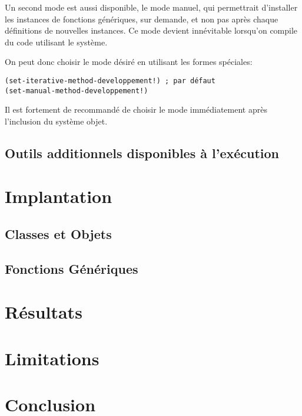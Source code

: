 \documentclass[letterpaper,12pt]{book}
\begin{document}
        Un second mode est aussi disponible, le mode manuel, qui
        permettrait d'installer les instances de fonctions génériques,
        sur demande, et non pas après chaque définitions de nouvelles
        instances. Ce mode devient innévitable lorsqu'on compile du
        code utilisant le système.

        On peut donc choisir le mode désiré en utilisant les formes
        spéciales:

        \begin{lstlisting}
(set-iterative-method-developpement!) ; par défaut
(set-manual-method-developpement!)
        \end{lstlisting}

        Il est fortement de recommandé de choisir le mode
        immédiatement après l'inclusion du système objet.

    \subsection{Outils additionnels disponibles à l'exécution}

\clearpage



\section{Implantation}

\subsection{Classes et Objets}

\subsection{Fonctions Génériques}


\clearpage

\section{Résultats}

\clearpage

 
\section{Limitations}


\clearpage

\section{Conclusion}


\clearpage




\end{document}

